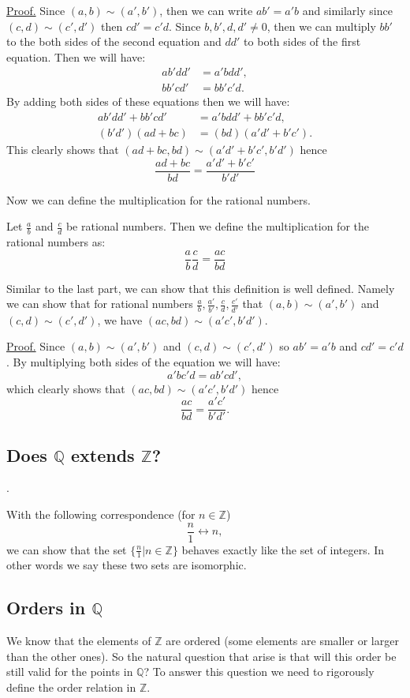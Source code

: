 \underline{Proof.} Since $ (a,b) \sim (a',b') $, then we can write $ ab' = a'b $ and similarly since $ (c,d) \sim (c',d') $ then $ cd' = c'd $. Since $ b,b',d,d' \neq 0 $, then we can multiply $ bb' $ to the both sides of the second equation and $ dd' $ to both sides of the first equation. Then we will have:
\begin{align*}
	ab'dd' &= a'bdd', \\
	bb'cd' &= bb'c'd.
\end{align*}
By adding both sides of these equations then we will have: 
\begin{align*}
	ab'dd' + bb'cd' &= a'bdd' + bb'c'd, \\
	(b'd')(ad+bc) &= (bd)(a'd' + b'c').
\end{align*}
This clearly shows that $ (ad+bc, bd) \sim (a'd'+b'c', b'd') $ hence \[\frac{ad+bc}{bd} = \frac{a'd' + b'c'}{b'd'} \]


Now we can define the multiplication for the rational numbers.
\begin{definition}
	Let $ \frac{a}{b} $ and $ \frac{c}{d} $ be rational numbers. Then we define the multiplication for the rational numbers as:
	\[ \frac{a}{b} \frac{c}{d} = \frac{ac}{bd} \]
\end{definition}

Similar to the last part, we can show that this definition is well defined. Namely we can show that for rational numbers $ \frac{a}{b},\frac{a'}{b'},\frac{c}{d},\frac{c'}{d'} $ that $ (a,b) \sim (a',b') $ and $ (c,d) \sim (c',d') $, we have $ (ac,bd) \sim (a'c', b'd') $.

\underline{Proof.} Since $ (a,b) \sim (a',b') $ and $ (c,d) \sim (c',d') $ so $ ab' = a'b $ and $ cd' = c'd $. By multiplying both sides of the equation we will have:
\[ a'bc'd = ab'cd', \] 
which clearly shows that  $ (ac,bd) \sim (a'c', b'd') $ hence
\[ \frac{ac}{bd} =  \frac{a'c'}{b'd'}. \]


\subsection{Does $ \mathbb{Q} $ extends $ \mathbb{Z} $?}.

With the following correspondence (for $ n \in \mathbb{Z} $)
\[ \frac{n}{1} \leftrightarrow n, \]
we can show that the set $ \{ \frac{n}{1} | n\in \mathbb{Z} \} $ behaves exactly like the set of integers. In other words we say these two sets are isomorphic.

\subsection{Orders in $ \mathbb{Q} $}
We know that the elements of $ \mathbb{Z} $ are ordered (some elements are smaller or larger than the other ones). So the natural question that arise is that will this order be still valid for the points in $ \mathbb{Q} $? To answer this question we need to rigorously define the order relation in $ \mathbb{Z} $.

